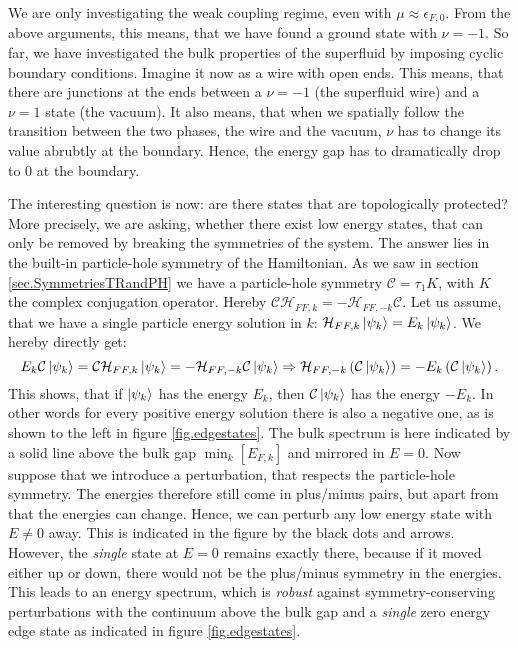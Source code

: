 We are only investigating the weak coupling regime, even with $\mu \approx \epsilon_{F,0}$. From the above arguments, this means, that we have found a ground state with $\nu = -1$. So far, we have investigated the bulk properties of the superfluid by imposing cyclic boundary conditions. Imagine it now as a wire with open ends. This means, that there are junctions at the ends between a $\nu = -1$ (the superfluid wire) and a $\nu = 1$ state (the vacuum). It also means, that when we spatially follow the transition between the two phases, the wire and the vacuum, $\nu$ has to change its value abrubtly at the boundary. Hence, the energy gap has to dramatically drop to $0$ at the boundary. 

The interesting question is now: are there states that are topologically protected? More precisely, we are asking, whether there exist low energy states, that can only be removed by breaking the symmetries of the system. The answer lies in the built-in particle-hole symmetry of the Hamiltonian. As we saw in section \ref{sec.SymmetriesTRandPH} we have a particle-hole symmetry $\mathcal{C} = \tau_1 K$, with $K$ the complex conjugation operator. Hereby $\mathcal{C}\mathcal{H}_{FF,k} = -\mathcal{H}_{FF,-k}\mathcal{C}$. Let us assume, that we have a single particle energy solution in $k$: $\mathcal{H}_{FF,k}\ket{\psi_k} = E_k\ket{\psi_k}$. We hereby directly get:
\begin{equation}
E_k\mathcal{C}\ket{\psi_k} = \mathcal{C}\mathcal{H}_{FF,k}\ket{\psi_k} = -\mathcal{H}_{FF,-k}\mathcal{C}\ket{\psi_k} \Rightarrow \mathcal{H}_{FF,-k}\left(\mathcal{C}\ket{\psi_k}\right) = -E_k\left(\mathcal{C}\ket{\psi_k}\right).
\end{equation}
This shows, that if $\ket{\psi_k}$ has the energy $E_k$, then $\mathcal{C}\ket{\psi_k}$ has the energy $-E_k$. In other words for every positive energy solution there is also a negative one, as is shown to the left in figure \ref{fig.edgestates}. The bulk spectrum is here indicated by a solid line above the bulk gap $\min_k[E_{F,k}]$ and mirrored in $E = 0$. Now suppose that we introduce a perturbation, that respects the particle-hole symmetry. The energies therefore still come in plus/minus pairs, but apart from that the energies can change. Hence, we can perturb any low energy state with $E \neq 0 $ away. This is indicated in the figure by the black dots and arrows. However, the \textit{single} state at $E = 0$ remains exactly there, because if it moved either up or down, there would not be the plus/minus symmetry in the energies. This leads to an energy spectrum, which is \textit{robust} against symmetry-conserving perturbations with the continuum above the bulk gap and a \textit{single} zero energy edge state as indicated in figure \ref{fig.edgestates}. 

